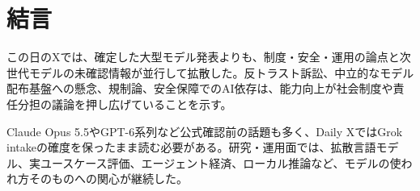\section*{結言}
この日のXでは、確定した大型モデル発表よりも、制度・安全・運用の論点と次世代モデルの未確認情報が並行して拡散した。反トラスト訴訟、中立的なモデル配布基盤への懸念、規制論、安全保障でのAI依存は、能力向上が社会制度や責任分担の議論を押し広げていることを示す。

Claude Opus 5.5やGPT-6系列など公式確認前の話題も多く、Daily XではGrok intakeの確度を保ったまま読む必要がある。研究・運用面では、拡散言語モデル、実ユースケース評価、エージェント経済、ローカル推論など、モデルの使われ方そのものへの関心が継続した。
